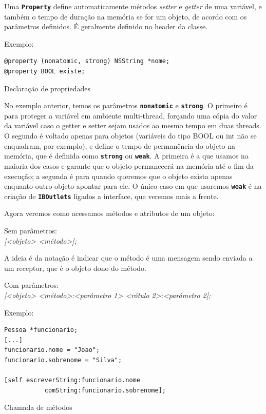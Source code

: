 \documentclass[a4paper,12pt,brazil,oneside]{book}
\begin{document}
Uma \texttt{\textbf{Property}} define automaticamente métodos \emph{setter} e \emph{getter} de uma variável, e também o tempo de duração na memória se for um objeto, de acordo com os parâmetros definidos. É geralmente definido no header da classe.

Exemplo:

\begin{listing}[H]
\begin{verbatim}
@property (nonatomic, strong) NSString *nome;
@property BOOL existe;
\end{verbatim}
\caption{Declaração de propriedades}
\end{listing}


No exemplo anterior, temos os parâmetros \texttt{\textbf{nonatomic}} e \texttt{\textbf{strong}}. O primeiro é para proteger a variável em ambiente multi-thread, forçando uma cópia do valor da variável caso o getter e setter sejam usados ao mesmo tempo em duas threads. O segundo é voltado apenas para objetos (variáveis do tipo BOOL ou int não se enquadram, por exemplo), e define o tempo de permanência do objeto na memória, que é definida como \texttt{\textbf{strong}} ou \texttt{\textbf{weak}}. A primeira é a que usamos na maioria dos casos e garante que o objeto permanecerá na memória até o fim da execução; a segunda é para quando queremos que o objeto exista apenas enquanto outro objeto apontar para ele. O único caso em que usaremos \texttt{\textbf{weak}} é na criação de \texttt{\textbf{IBOutlets}} ligados a interface, que veremos mais a frente.


Agora veremos como acessamos métodos e atributos de um objeto:


Sem parâmetros:\\
\emph{[<objeto> <método>];}


A ideia é da notação é indicar que o método é uma mensagem sendo enviada a um receptor, que é o objeto dono do método.


Com parâmetros:\\
\emph{[<objeto> <método>:<parâmetro 1> <rótulo 2>:<parâmetro 2];}


Exemplo:

\begin{listing}
\begin{verbatim}
Pessoa *funcionario;
[...]
funcionario.nome = "Joao";
funcionario.sobrenome = "Silva";

[self escreverString:funcionario.nome
           comString:funcionario.sobrenome];
\end{verbatim}
\caption{Chamada de métodos}
\end{listing}
\end{document}

